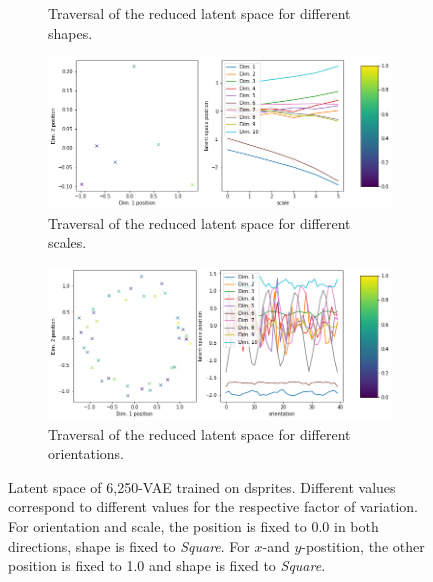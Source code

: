 \begin{figure}[H]
\begin{subfigure}{.48\textwidth}
        \caption{Traversal of the reduced latent space for different shapes.}
    \end{subfigure}
    \begin{subfigure}{.48\textwidth}
        \includegraphics[width=\textwidth]{images/latent_space_traversals/vae_6250_dsprites_latent_space_values_scale.png}
        \caption{Traversal of the reduced latent space for different scales.}
    \end{subfigure}
    \begin{subfigure}{.48\textwidth}
        \includegraphics[width=\textwidth]{images/latent_space_traversals/vae_6250_dsprites_latent_space_values_orientation.png}
        \caption{Traversal of the reduced latent space for different orientations.}
    \end{subfigure}
    \caption[\ac{VAE} on dsprites: Latent Space Values]{Latent space of 6,250-\ac{VAE} trained on dsprites. Different values correspond to different values for the respective factor of variation. For orientation and scale, the position is fixed to 0.0 in both directions, shape is fixed to \textit{Square}. For $x$-and $y$-postition, the other position is fixed to 1.0 and shape is fixed to \textit{Square}.}
    \label{fig:vae_dsprite_6250_latent_space_position}
\end{figure}

